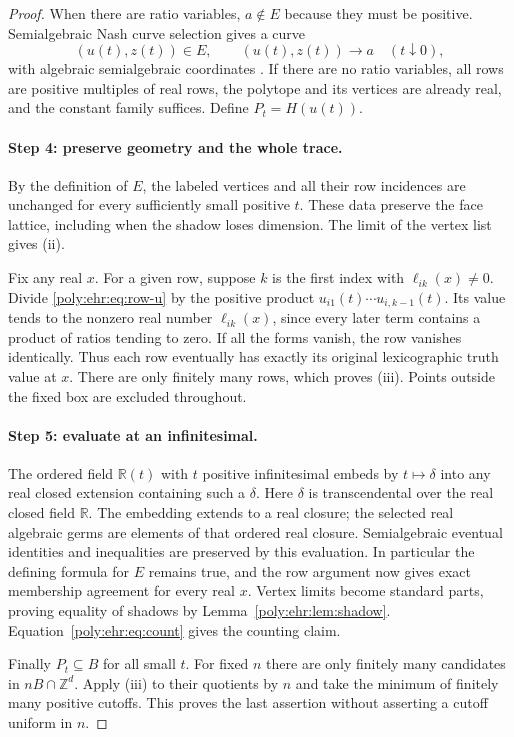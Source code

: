\documentclass[11pt,a4paper]{article}
\numberwithin{equation}{section}
\theoremstyle{plain}
\newcommand{\R}{\mathbb R}
\newcommand{\Z}{\mathbb Z}
\begin{document}
\begin{proof}
When there are ratio variables, $a\notin E$ because they must be positive.
Semialgebraic Nash curve selection gives a curve
\[
 (u(t),z(t))\in E,\qquad (u(t),z(t))\longrightarrow a
                       \quad(t\downarrow0),
\]
with algebraic semialgebraic coordinates
\cite{ehr:basu-roy,ehr:fernando}. If there are no ratio variables, all rows are
positive multiples of real rows, the polytope and its vertices are already
real, and the constant family suffices. Define $P_t=H(u(t))$.

\paragraph{Step 4: preserve geometry and the whole trace.}
By the definition of $E$, the labeled vertices and all their row incidences
are unchanged for every sufficiently small positive $t$. These data
preserve the face lattice, including when the shadow loses dimension.
The limit of the vertex list gives (ii).

Fix any real $x$. For a given row, suppose $k$ is the first index with
$\ell_{ik}(x)\ne0$. Divide \eqref{poly:ehr:eq:row-u} by the positive product
$u_{i1}(t)\cdots u_{i,k-1}(t)$. Its value tends to the nonzero real number
$\ell_{ik}(x)$, since every later term contains a product of ratios tending
to zero. If all the forms vanish, the row vanishes identically. Thus each
row eventually has exactly its original lexicographic truth value at $x$.
There are only finitely many rows, which proves (iii). Points outside the
fixed box are excluded throughout.

\paragraph{Step 5: evaluate at an infinitesimal.}
The ordered field $\R(t)$ with $t$ positive infinitesimal embeds by
$t\mapsto\delta$ into any real closed extension containing such a
$\delta$. Here $\delta$ is transcendental over the real closed field $\R$.
The embedding extends to a real closure; the selected real algebraic germs
are elements of that ordered real closure. Semialgebraic eventual
identities and inequalities are preserved by this evaluation. In
particular the defining formula for $E$ remains true, and the row argument
now gives exact membership agreement for every real $x$. Vertex limits
become standard parts, proving equality of shadows by
Lemma~\ref{poly:ehr:lem:shadow}. Equation~\eqref{poly:ehr:eq:count} gives the counting claim.

Finally $P_t\subseteq B$ for all small $t$. For fixed $n$ there are only
finitely many candidates in $nB\cap\Z^d$. Apply (iii) to their quotients
by $n$ and take the minimum of finitely many positive cutoffs. This proves
the last assertion without asserting a cutoff uniform in $n$.
\end{proof}
\end{document}
